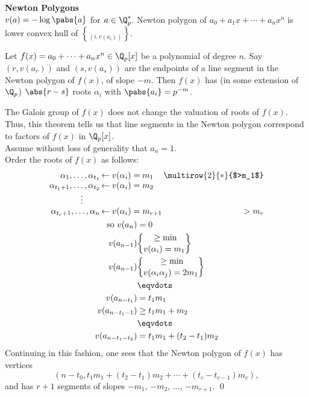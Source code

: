 \textbf{Newton Polygons} \\
$v(a)=-\log\pabs{a}$ for $a\in\Q_p^*$.
Newton polygon of $a_0+a_1x+\dotsb+a_nx^n$ is lower convex hull of $\brace{(i,v(a_i))}$.

\thm Let $f(x)=a_0+\dotsb+a_nx^n\in\Q_p[x]$ be a polynomial of degree $n$.
Say $(r,v(a_r))$ and $(s,v(a_s))$ are the endpoints of a line segment in the Newton polygon of $f(x)$, of slope $-m$.
Then $f(x)$ has (in some extension of $\Q_p$) $\abs{r-s}$ roots $\alpha_i$ with $\pabs{a_i}=p^{-m}$.

\note The Galois group of $f(x)$ does not change the valuation of roots of $f(x)$.
Thus, this theorem tells us that line segments in the Newton polygon correspond to factors of $f(x)$ in $\Q_p[x]$. \\
\pf Assume without loss of generality that $a_n=1$. \\
Order the roots of $f(x)$ as follows:
\begin{gather*}
\begin{array}{r@{\,}l@{\,}r}
	\alpha_1,\dotsc,\alpha_{t_1} & \leftarrow v(\alpha_i) = m_1 & \multirow{2}{*}{$>m_1$} \\
	\alpha_{t_1+1},\dotsc,\alpha_{t_2} & \leftarrow v(\alpha_i) = m_2 \\
	\vdots\qquad \\
	\alpha_{t_r+1},\dotsc,\alpha_n & \leftarrow v(\alpha_i) = m_{r+1} & > m_r
\end{array} \\
\begin{aligned}
	\text{so } v(a_n) &= 0 \\
	v(a_{n-1}) &\geq \min\brace{v(\alpha_i)} = m_1 \\
	v(a_{n-1}) &\geq \min\brace{v(\alpha_i\alpha_j)} = 2m_1 \\
	&\eqvdots \\
	v(a_{n-t_1}) &= t_1m_1 \\
	v(a_{n-t_1-1}) &\geq t_1m_1+m_2 \\
	&\eqvdots \\
	v(a_{n-t_1-t_2}) &= t_1m_1 + (t_2-t_1)m_2
\end{aligned}
\end{gather*}
Continuing in this fashion, one sees that the Newton polygon of $f(x)$ has vertices
\[ (n-t_0,t_1m_1+(t_2-t_1)m_2+\dotsb+(t_c-t_{c-1})m_c), \]
and has $r+1$ segments of slopes $-m_1$, $-m_2$, $\dotsc$, $-m_{r+1}$. \qed

